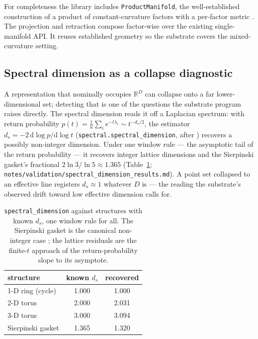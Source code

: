 \documentclass{article}
\newcommand{\R}{\mathbb{R}}
\newcommand{\code}[1]{\texttt{#1}}
\begin{document}
For completeness the library includes \code{ProductManifold}, the
well-established construction of a product of constant-curvature factors
with a per-factor metric \citep{gu2019learning,skopek2020mixed}. The
projection and retraction compose factor-wise over the existing
single-manifold API. It reuses established geometry so the substrate
covers the mixed-curvature setting.

\subsection{Spectral dimension as a collapse diagnostic}
\label{sec:specdim}

A representation that nominally occupies $\R^D$ can collapse onto a far
lower-dimensional set; detecting that is one of the questions the
substrate program raises directly. The spectral dimension reads it off a
Laplacian spectrum: with return probability
$p(t) = \tfrac1n\sum_i e^{-t\lambda_i} \sim t^{-d_s/2}$, the estimator
$d_s = -2\,\mathrm{d}\log p / \mathrm{d}\log t$
(\code{spectral.spectral\_dimension}, after \citet{rammal1983}) recovers
a possibly non-integer dimension. Under one window rule --- the
asymptotic tail of the return probability --- it recovers integer lattice
dimensions and the Sierpinski gasket's fractional
$2\ln 3/\ln 5 \approx 1.365$ (Table~\ref{tab:specdim};
\code{notes/validation/spectral\_dimension\_results.md}). A point set
collapsed to an effective line registers $d_s \approx 1$ whatever $D$ is
--- the reading the substrate's observed drift toward low effective
dimension calls for.

\begin{table}[t]
  \centering
  \caption{\code{spectral\_dimension} against structures with known
  $d_s$, one window rule for all. The Sierpinski gasket is the canonical
  non-integer case \citep{rammal1983}; the lattice residuals are the
  finite-$t$ approach of the return-probability slope to its asymptote.}
  \label{tab:specdim}
  \begin{tabular}{lcc}
    \toprule
    structure & known $d_s$ & recovered \\
    \midrule
    1-D ring (cycle) & 1.000 & 1.000 \\
    2-D torus & 2.000 & 2.031 \\
    3-D torus & 3.000 & 3.094 \\
    Sierpinski gasket & 1.365 & 1.320 \\
    \bottomrule
  \end{tabular}
\end{table}
\end{document}
